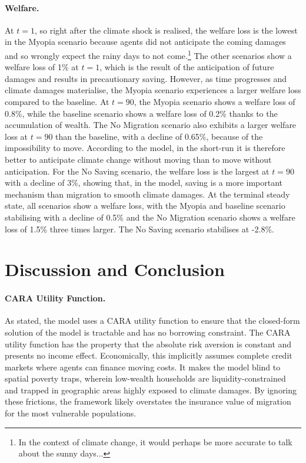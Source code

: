 \documentclass[11pt, a4paper]{article}
\begin{document}
\paragraph{Welfare.} At $t = 1$, so right after the climate shock is realised, the welfare loss is the lowest in the Myopia scenario because agents did not anticipate the coming damages and so wrongly expect the rainy days to not come.\footnote{In the context of climate change, it would perhaps be more accurate to talk about the sunny days...} The other scenarios show a welfare loss of 1\% at $t = 1$, which is the result of the anticipation of future damages and results in precautionary saving. However, as time progresses and climate damages materialise, the Myopia scenario experiences a larger welfare loss compared to the baseline. At $t = 90$, the Myopia scenario shows a welfare loss of 0.8\%, while the baseline scenario shows a welfare loss of 0.2\% thanks to the accumulation of wealth. The No Migration scenario also exhibits a larger welfare loss at $t = 90$ than the baseline, with a decline of 0.65\%, because of the impossibility to move. According to the model, in the short-run it is therefore better to anticipate climate change without moving than to move without anticipation. For the No Saving scenario, the welfare loss is the largest at $t = 90$ with a decline of 3\%, showing that, in the model, saving is a more important mechanism than migration to smooth climate damages. At the terminal steady state, all scenarios show a welfare loss, with the Myopia and baseline scenario stabilising with a decline of 0.5\% and the No Migration scenario shows a welfare loss of 1.5\% three times larger. The No Saving scenario stabilises at -2.8\%. 

\FloatBarrier
\section{Discussion and Conclusion}
\label{sec:discussion}

\paragraph{CARA Utility Function.}
As stated, the model uses a CARA utility function to ensure that the closed-form solution of the model is tractable and has no borrowing constraint. The CARA utility function has the property that the absolute risk aversion is constant and presents no income effect. Economically, this implicitly assumes complete credit markets where agents can finance moving costs. It makes the model blind to spatial poverty traps, wherein low-wealth households are liquidity-constrained and trapped in geographic areas highly exposed to climate damages. By ignoring these frictions, the framework likely overstates the insurance value of migration for the most vulnerable populations.
\end{document}
